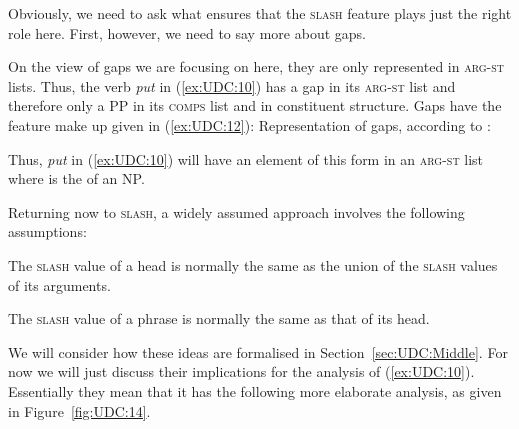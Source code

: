 \documentclass[output=paper
,notxmath 
 	        ,biblatex
                ,babelshorthands
                ,newtxmath
                ,draftmode
                ,colorlinks, citecolor=brown
]{langscibook}
\begin{document}

Obviously, we need to ask what ensures that the \textsc{slash} feature plays just
the right role here. First, however, we need to say more about gaps.

On the view of gaps we are focusing on here, they are only represented in
\textsc{arg-st} lists. Thus, the verb \emph{put} in (\ref{ex:UDC:10})
 has a gap in its
\textsc{arg-st} list and therefore only a PP in its \textsc{comps} list and
in constituent structure. Gaps have the feature make up given in
(\ref{ex:UDC:12}):
\ea
\label{ex:UDC:12}
Representation of gaps, according to \citet[161]{Pollard:Sag:94}:\\
\z  


\noindent
Thus, \emph{put} in (\ref{ex:UDC:10}) will have an element of this
form in an \textsc{arg-st} list where  is the \localv of an
NP.

Returning now to \textsc{slash}, a widely assumed approach involves the following
assumptions:

\eal
\label{ex:UDC:13}
\ex
The \textsc{slash} value of a head is normally the same as the union of the \textsc{slash} values of its
arguments.

\ex
The \textsc{slash} value of a phrase is normally the same as that of its head.
\zl

\noindent
We will consider how these ideas are formalised in
Section~\ref{sec:UDC:Middle}. For now we will just discuss their
implications for the analysis of (\ref{ex:UDC:10}).  Essentially they
mean that it has the following more elaborate analysis, as given in Figure~\ref{fig:UDC:14}.
\end{document}
